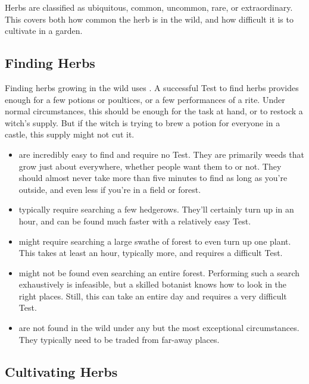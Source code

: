 Herbs are classified as ubiquitous, common, uncommon, rare, or extraordinary.
This covers both how common the herb is in the wild, and how difficult it is to cultivate in a garden.

\subsection{Finding Herbs}

Finding herbs growing in the wild uses .
A successful Test to find herbs provides enough for a few potions or poultices, or a few performances of a rite.
Under normal circumstances, this should be enough for the task at hand, or to restock a witch's supply.
But if the witch is trying to brew a potion for everyone in a castle, this supply might not cut it.

\begin{itemize}
	\item
		 are incredibly easy to find and require no Test.
		They are primarily weeds that grow just about everywhere, whether people want them to or not.
		They should almost never take more than five minutes to find as long as you're outside, and even less if you're in a field or forest.
	\item
		 typically require searching a few hedgerows.
		They'll certainly turn up in an hour, and can be found much faster with a relatively easy Test.
	\item
		 might require searching a large swathe of forest to even turn up one plant.
		This takes at least an hour, typically more, and requires a difficult Test.
	\item
		 might not be found even searching an entire forest.
		Performing such a search exhaustively is infeasible, but a skilled botanist knows how to look in the right places.
		Still, this can take an entire day and requires a very difficult Test.
	\item
		 are not found in the wild under any but the most exceptional circumstances.
		They typically need to be traded from far-away places.
\end{itemize}

\subsection{Cultivating Herbs}

